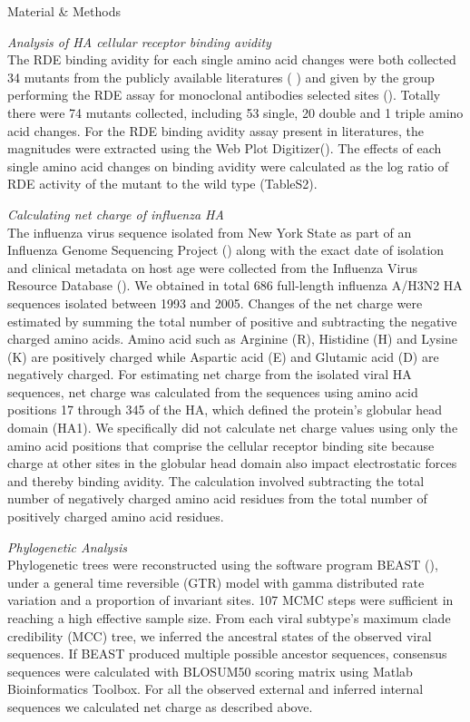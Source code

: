 \documentclass[12pt,a4paper]{article}
\begin{document}
    

 
Material \& Methods


\textit{Analysis of HA cellular receptor binding avidity} \\
The RDE binding avidity for each single amino acid changes were both collected 34 mutants from the publicly available literatures (\cite{Hensley2009} \cite{Das2011} \cite{Myers2013} \cite{Li}) and given by the group performing the RDE assay for monoclonal antibodies selected sites (\cite{Hensley2009}). Totally there were 74 mutants collected, including 53 single, 20 double and 1 triple amino acid changes. For the RDE binding avidity assay present in literatures, the magnitudes were extracted using the Web Plot Digitizer(\cite{Rohatgi2012}). The effects of each single amino acid changes on binding avidity were calculated as the log ratio of RDE activity of the mutant to the wild type (TableS2).

\textit{Calculating net charge of influenza HA} \\
The influenza virus sequence isolated from New York State as part of an Influenza Genome Sequencing Project (\cite{Ghedin2005}) along with the exact date of isolation and clinical metadata on host age were collected from the Influenza Virus Resource Database (\cite{Bao2008}). We obtained in total 686 full-length influenza A/H3N2 HA sequences isolated between 1993 and 2005. Changes of the net charge were estimated by summing the total number of positive and subtracting the negative  charged amino acids. Amino acid such as Arginine (R), Histidine (H) and Lysine (K) are positively charged while Aspartic acid (E) and Glutamic acid (D) are negatively charged. For estimating net charge from the isolated viral HA sequences, net charge was calculated from the sequences using amino acid positions 17 through 345 of the HA, which defined the protein’s globular head domain (HA1). We specifically did not calculate net charge values using only the amino acid positions that comprise the cellular receptor binding site because charge at other sites in the globular head domain also impact electrostatic forces and thereby binding avidity. The calculation involved subtracting the total number of negatively charged amino acid residues from the total number of positively charged amino acid residues.

\textit{Phylogenetic Analysis} \\
Phylogenetic trees were reconstructed using the software program BEAST (\cite{Drummond2012}), under a general time reversible (GTR) model with gamma distributed rate variation and a proportion of invariant sites. 107 MCMC steps were sufficient in reaching a high effective sample size. From each viral subtype’s maximum clade credibility (MCC) tree, we inferred the ancestral states of the observed viral sequences. If BEAST produced multiple possible ancestor sequences, consensus sequences were calculated with BLOSUM50 scoring matrix using Matlab Bioinformatics Toolbox. For all the observed external and inferred internal sequences we calculated net charge as described above.
\end{document}

